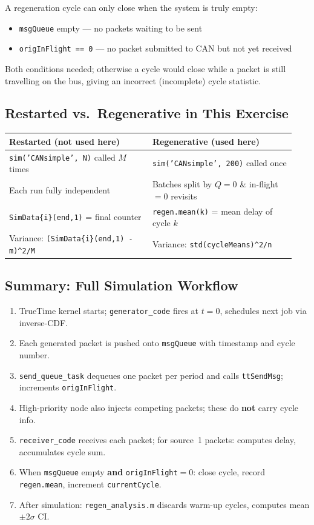 \documentclass[10pt,a4paper]{article}
\begin{document}
\begin{notebox}
A regeneration cycle can only close when the system is truly empty:
\begin{itemize}
  \item \texttt{msgQueue} empty --- no packets waiting to be sent
  \item \texttt{origInFlight == 0} --- no packet submitted to CAN but not yet received
\end{itemize}
Both conditions needed; otherwise a cycle would close while a packet is still travelling on the bus, giving an incorrect (incomplete) cycle statistic.
\end{notebox}

\subsection*{Restarted vs.\ Regenerative in This Exercise}

\begin{tabular}{@{}p{0.47\linewidth}@{\quad}p{0.47\linewidth}@{}}
\toprule
\textbf{Restarted (not used here)} & \textbf{Regenerative (used here)} \\\midrule
\texttt{sim('CANsimple', N)} called $M$ times & \texttt{sim('CANsimple', 200)} called once \\
Each run fully independent & Batches split by $Q=0$ \& in-flight$=0$ revisits \\
\texttt{SimData\{i\}(end,1)} = final counter & \texttt{regen.mean(k)} = mean delay of cycle $k$ \\
Variance: \texttt{(SimData\{i\}(end,1) - m)\^{}2/M} & Variance: \texttt{std(cycleMeans)\^{}2/n} \\
\bottomrule
\end{tabular}

\subsection*{Summary: Full Simulation Workflow}

\begin{enumerate}
  \item TrueTime kernel starts; \texttt{generator\_code} fires at $t=0$, schedules next job via inverse-CDF.
  \item Each generated packet is pushed onto \texttt{msgQueue} with timestamp and cycle number.
  \item \texttt{send\_queue\_task} dequeues one packet per period and calls \texttt{ttSendMsg}; increments \texttt{origInFlight}.
  \item High-priority node also injects competing packets; these do \textbf{not} carry cycle info.
  \item \texttt{receiver\_code} receives each packet; for source~1 packets: computes delay, accumulates cycle sum.
  \item When \texttt{msgQueue} empty \textbf{and} \texttt{origInFlight}$=0$: close cycle, record \texttt{regen.mean}, increment \texttt{currentCycle}.
  \item After simulation: \texttt{regen\_analysis.m} discards warm-up cycles, computes mean $\pm 2\sigma$ CI.
\end{enumerate}
\end{document}
